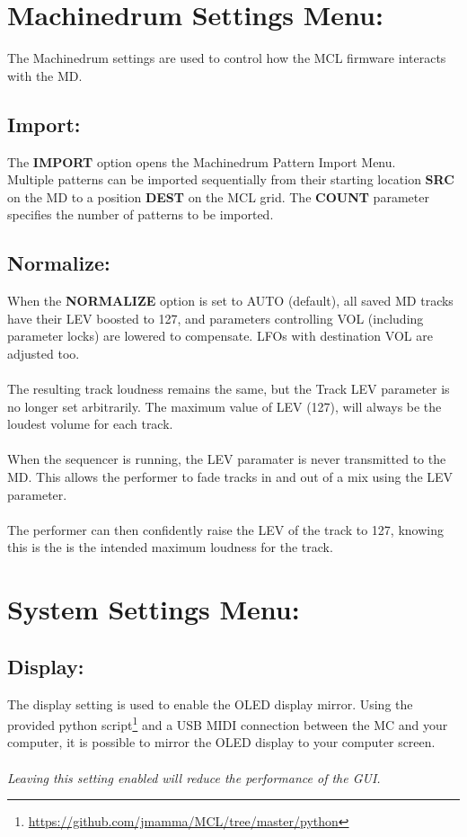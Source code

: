 \chapter{Machinedrum Settings Menu:}
The Machinedrum settings are used to control how the MCL firmware interacts with the MD.
\section{Import:}
The \textbf{IMPORT} option opens the Machinedrum Pattern Import Menu.\\ 
Multiple patterns can be imported sequentially from their starting location \textbf{SRC} on the MD to a position \textbf{DEST} on the MCL grid. The \textbf{COUNT} parameter specifies the number of patterns to be imported.
\section{Normalize:}
When the \textbf{NORMALIZE} option is set to AUTO (default), all saved MD tracks have their LEV boosted to 127, and parameters controlling VOL (including parameter locks) are lowered
to compensate. LFOs with destination VOL are 
adjusted too.\\
\\
The resulting track loudness remains the same, but the Track LEV parameter is no longer set arbitrarily. The maximum value of LEV (127), will always be the loudest volume for each track.\\
\\
When the sequencer is running, the LEV paramater is never transmitted to the MD. This allows the performer to fade tracks in and out of a mix using the LEV parameter.\\
\\
The performer can then confidently raise the LEV of the track to 127, knowing this is the is the intended maximum loudness for the track.

\chapter{System Settings Menu:}

\section{Display:}
The display setting is used to enable the OLED display mirror. Using the provided python script\footnote{\url{https://github.com/jmamma/MCL/tree/master/python}} and a USB MIDI connection between the MC and your computer, it is possible to mirror the OLED display to your computer screen.\\
\\
\textit{Leaving this setting enabled will reduce the performance of the GUI.}

